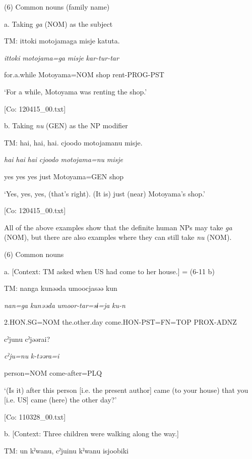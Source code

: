 (6)  Common nouns (family name)

  a.  Taking \textit{ga} (NOM) as the subject

    TM:  {\textbar}ittoki{\textbar}  motojamaga  misje  katuta.

      \textit{ittoki}  \textit{motojama=ga}  \textit{misje}  \textit{kar-tur-tar}

      for.a.while  Motoyama=NOM  shop  rent-PROG-PST

      ‘For a while, Motoyama was renting the shop.’

      [Co: 120415\_00.txt]

  b.  Taking \textit{nu} (GEN) as the NP modifier

    TM:  {\textbar}hai,  hai,  hai{\textbar}.  cjoodo  motojamanu  misje.

      \textit{hai}  \textit{hai}  \textit{hai}  \textit{cjoodo}  \textit{motojama=nu}  \textit{misje}

      yes  yes  yes  just  Motoyama=GEN  shop

      ‘Yes, yes, yes, (that’s right). (It is) just (near) Motoyama’s shop.’

      [Co: 120415\_00.txt]

  All of the above examples show that the definite human NPs may take \textit{ga} (NOM), but there are also examples where they can still take \textit{nu} (NOM).

(6)  Common nouns

  a.  [Context: TM asked when US had come to her house.] = (6-11 b)

    TM:  nanga  kunəəda  umoocjasəə  kun

      \textit{nan=ga}  \textit{kunəəda}  \textit{umoor-tar=sɨ=ja}  \textit{ku-n}

      2.HON.SG=NOM  the.other.day  come.HON-PST=FN=TOP  PROX-ADNZ

      cˀjunu  cˀjəərai?

      \textit{cˀju=nu}  \textit{k-təəra=i}

      person=NOM  come-after=PLQ

      ‘(Is it) after this person [i.e. the present author] came (to your house) that you [i.e. US] came (here) the other day?’

      [Co: 110328\_00.txt]

  b.  [Context: Three children were walking along the way.]

    TM:  un  kˀwanu,  cˀjuinu  kˀwanu  isjoobiki

